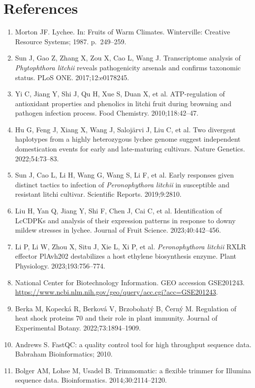 \documentclass[11pt]{article}
\begin{document}
\section*{References}
\begin{enumerate}[itemsep=1pt,leftmargin=1.6em]
\item Morton JF. Lychee. In: Fruits of Warm Climates. Winterville: Creative Resource Systems; 1987. p.~249--259.
\item Sun J, Gao Z, Zhang X, Zou X, Cao L, Wang J. Transcriptome analysis of \textit{Phytophthora litchii} reveals pathogenicity arsenals and confirms taxonomic status. PLoS ONE. 2017;12:e0178245.
\item Yi C, Jiang Y, Shi J, Qu H, Xue S, Duan X, et al. ATP-regulation of antioxidant properties and phenolics in litchi fruit during browning and pathogen infection process. Food Chemistry. 2010;118:42--47.
\item Hu G, Feng J, Xiang X, Wang J, Saloj\"arvi J, Liu C, et al. Two divergent haplotypes from a highly heterozygous lychee genome suggest independent domestication events for early and late-maturing cultivars. Nature Genetics. 2022;54:73--83.
\item Sun J, Cao L, Li H, Wang G, Wang S, Li F, et al. Early responses given distinct tactics to infection of \textit{Peronophythora litchii} in susceptible and resistant litchi cultivar. Scientific Reports. 2019;9:2810.
\item Liu H, Yan Q, Jiang Y, Shi F, Chen J, Cai C, et al. Identification of LcCDPKs and analysis of their expression patterns in response to downy mildew stresses in lychee. Journal of Fruit Science. 2023;40:442--456.
\item Li P, Li W, Zhou X, Situ J, Xie L, Xi P, et al. \textit{Peronophythora litchii} RXLR effector PlAvh202 destabilizes a host ethylene biosynthesis enzyme. Plant Physiology. 2023;193:756--774.
\item National Center for Biotechnology Information. GEO accession GSE201243. \url{https://www.ncbi.nlm.nih.gov/geo/query/acc.cgi?acc=GSE201243}.
\item Berka M, Kopeck\'a R, Berkov\'a V, Brzobohat\'y B, \v{C}ern\'y M. Regulation of heat shock proteins 70 and their role in plant immunity. Journal of Experimental Botany. 2022;73:1894--1909.
\item Andrews S. FastQC: a quality control tool for high throughput sequence data. Babraham Bioinformatics; 2010.
\item Bolger AM, Lohse M, Usadel B. Trimmomatic: a flexible trimmer for Illumina sequence data. Bioinformatics. 2014;30:2114--2120.

\end{enumerate}
\end{document}
